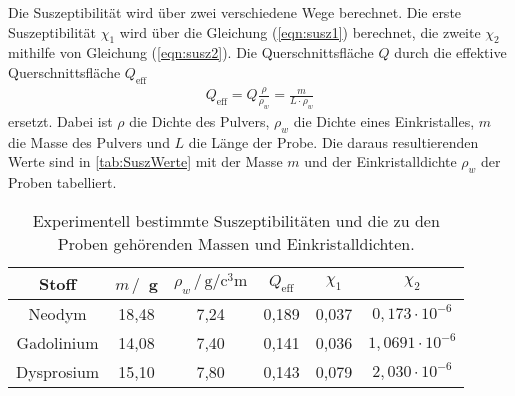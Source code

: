 \noindent
Die Suszeptibilität wird über zwei verschiedene Wege berechnet. Die erste Suszeptibilität $\chi_1$ wird über die Gleichung (\ref{eqn:susz1}) berechnet, die zweite $\chi_2$ mithilfe von Gleichung (\ref{eqn:susz2}).
Die Querschnittsfläche $Q$ durch die effektive Querschnittsfläche $Q_{\text{eff}}$
\begin{align*}
  Q_{\text{eff}} = Q\frac{\rho}{\rho_w} = \frac{m}{L\cdot\rho_w}
\end{align*}
ersetzt. Dabei ist $\rho$ die Dichte des Pulvers, $\rho_w$ die Dichte eines Einkristalles, $m$ die Masse des Pulvers und $L$ die Länge der Probe.
Die daraus resultierenden Werte sind in \autoref{tab:SuszWerte} mit der Masse $m$ und der Einkristalldichte $\rho_w$ der Proben tabelliert.
\begin{table}[H]
  \centering
  \caption{Experimentell bestimmte Suszeptibilitäten und die zu den Proben gehörenden Massen und Einkristalldichten.}
  \label{tab:SuszWerte}
  \begin{tabular}{c c c c c c}
    \toprule
    Stoff & $m \,/\,$ g & $\rho_w \, / \, \si{\gram\per\cubic\centi\meter}$ & $Q_{\text{eff}}$ & $\chi_1$ & $\chi_2$ \\
    \midrule
    Neodym & 18,48 & 7,24 & 0,189 & 0,037 & $0,173 \cdot 10^{-6}$  \\
    Gadolinium & 14,08 & 7,40 & 0,141 & 0,036 & $1,0691 \cdot 10^{-6}$ \\
    Dysprosium & 15,10 & 7,80 & 0,143 & 0,079 & $2,030 \cdot 10^{-6}$ \\
    \bottomrule
  \end{tabular}
\end{table}